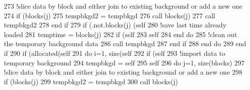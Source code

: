 \begin{DoxyCode}
273                         \textcolor{comment}{!slice data by block and either join to existing background or add a new one}
274                         \textcolor{keywordflow}{if} (blocks(j)%
275                             tempbkgd2 = tempbkgd%
276                             \textcolor{keyword}{call }blocks(j)%
277                             \textcolor{keyword}{call }tempbkgd2%
278 \textcolor{keywordflow}{                        end if}
279                         \textcolor{keywordflow}{if} (.not.blocks(j)%
      (self%
280                         \textcolor{comment}{!save last time already loaded}
281                         temptime = blocks(j)%
282                         \textcolor{keywordflow}{if} (self%
283                         self%
284 \textcolor{keywordflow}{                    end do}
285                     \textcolor{comment}{!clean out the temporary background data}
286                     \textcolor{keyword}{call }tempbkgd%
287 \textcolor{keywordflow}{                end if}
288 \textcolor{keywordflow}{            end do}
289 \textcolor{keywordflow}{        end if}
290         \textcolor{keywordflow}{if} (\textcolor{keyword}{allocated}(self%
291             \textcolor{keywordflow}{do} i=1, \textcolor{keyword}{size}(self%
292                 \textcolor{keywordflow}{if} (self%
293                     \textcolor{comment}{!import data to temporary background}
294                     tempbkgd = self%
295                     self%
296                     \textcolor{keywordflow}{do} j=1, \textcolor{keyword}{size}(blocks)
297                         \textcolor{comment}{!slice data by block and either join to existing background or add a new one}
298                         \textcolor{keywordflow}{if} (blocks(j)%
299                             tempbkgd2 = tempbkgd%
300                             \textcolor{keyword}{call }blocks(j)%

\end{DoxyCode}
